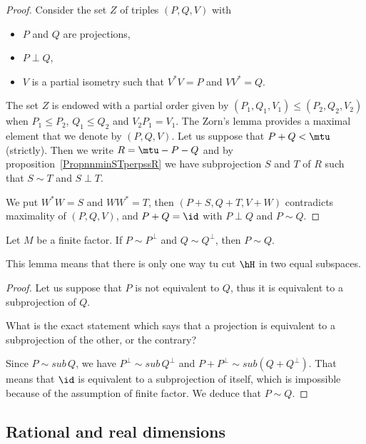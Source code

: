 \begin{proof}
	Consider the set \( Z\) of triples \( (P,Q,V)\) with
	\begin{itemize}
		\item \( P\) and \( Q\) are projections,
		\item \( P\perp Q\),
		\item
		      \( V\) is a partial isometry such that \( V^*V=P\) and \( VV^*=Q\).
	\end{itemize}
	The set $Z$ is endowed with a partial order given by $(P_1,Q_1,V_1)\leq (P_2,Q_2,V_2)$ when $P_1\leq P_2$, $Q_1\leq Q_2$ and $V_2P_1=V_1$. The Zorn's lemma provides a maximal element that we denote by $(P,Q,V)$. Let us suppose that $P+Q<\mtu$ (strictly). Then we write $R=\mtu-P-Q$ and by proposition~\ref{PropnnminSTperpssR} we have subprojection $S$ and $T$ of $R$ such that $S\sim T$ and $S\perp T$.

	We put $W^*W=S$ and $WW^*=T$, then $(P+S,Q+T,V+W)$ contradicts maximality of $(P,Q,V)$, and $P+Q=\id$ with $P\perp Q$ and $P\sim Q$.
\end{proof}

\begin{lemma}		\label{LemfinfacPPQQPsimQ}
	Let $M$ be a finite factor. If $P\sim P^{\perp}$ and $Q\sim Q^{\perp}$, then $P\sim Q$.
\end{lemma}

This lemma means that there is only one way tu cut $\hH$ in two equal subspaces.

\begin{proof}
	Let us suppose that $P$ is not equivalent to $Q$, thus it is equivalent to a subprojection of $Q$.

	\begin{probleme}
		What is the exact statement which says that a projection is equivalent to a subprojection of the other, or the contrary?
	\end{probleme}

	Since $P\sim sub\, Q$, we have $P^{\perp}\sim sub\, Q^{\perp}$ and $P+P^{\perp}\sim sub(Q+Q^{\perp})$. That means that $\id$ is equivalent to a subprojection of itself, which is impossible because of the assumption of finite factor. We deduce that $P\sim Q$.
\end{proof}

\subsection{Rational and real dimensions}
\label{SubSecRationalRealDim}

